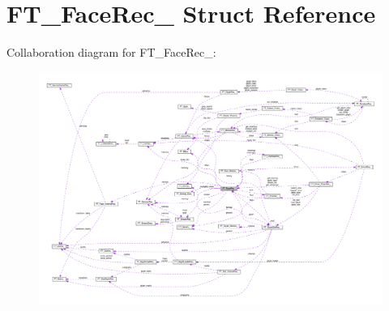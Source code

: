 \hypertarget{structFT__FaceRec__}{}\section{F\+T\+\_\+\+Face\+Rec\+\_\+ Struct Reference}
\label{structFT__FaceRec__}


Collaboration diagram for F\+T\+\_\+\+Face\+Rec\+\_\+\+:
\nopagebreak
\begin{figure}[H]
\begin{center}
\leavevmode
\includegraphics[width=350pt]{structFT__FaceRec____coll__graph}
\end{center}
\end{figure}
